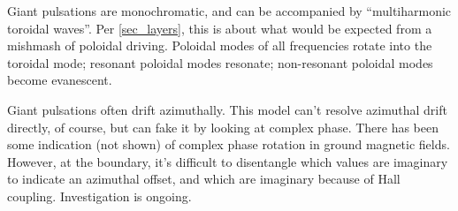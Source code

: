 Giant pulsations are monochromatic, and can be accompanied by ``multiharmonic toroidal waves''\cite{takahashi_2011}. Per \cref{sec_layers}, this is about what would be expected from a mishmash of poloidal driving. Poloidal modes of all frequencies rotate into the toroidal mode; resonant poloidal modes resonate; non-resonant poloidal modes become evanescent. 

Giant pulsations often drift azimuthally. This model can't resolve azimuthal drift directly, of course, but can fake it by looking at complex phase. There has been some indication (not shown) of complex phase rotation in ground magnetic fields. However, at the boundary, it's difficult to disentangle which values are imaginary to indicate an azimuthal offset, and which are imaginary because of Hall coupling. Investigation is ongoing. 
















